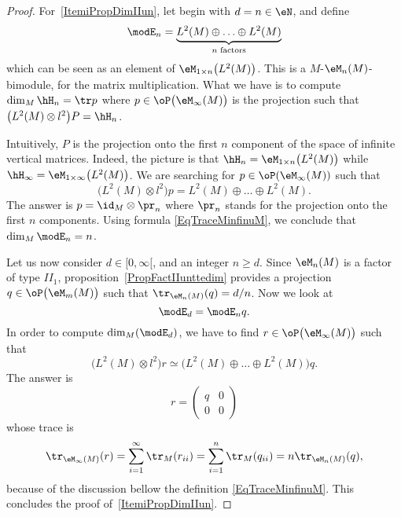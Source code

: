 \begin{proof}

	For~\ref{ItemiPropDimIIun}, let begin with $d=n\in \eN$, and define
	\begin{equation}
		\modE_n=\underbrace{  L^2(M)\oplus\ldots\oplus L^2(M)   }_{n \text{ factors}}
	\end{equation}
	which can be seen as an element of $\eM_{1\times n}\big( L^2(M) \big)$. This is a $M$-$\eM_n(M)$-bimodule, for the matrix multiplication. What we have is to compute $\dim_{M}\hH_n=\tr p$ where $p\in\oP\big( \eM_{\infty}(M) \big)$ is the projection such that $\big( L^2(M)\otimes l^2 \big)P=\hH_n$.

	Intuitively, $P$ is the projection onto the first $n$ component of the space of infinite vertical matrices. Indeed, the picture is that $\hH_n=\eM_{1\times n}\big( L^2(M) \big)$ while $\hH_{\infty}=\eM_{1\times \infty}\big( L^2(M) \big)$. We are searching for $p\in\oP(\eM_{\infty}(M))$ such that
	\begin{equation}
		\big( L^2(M)\otimes l^2 \big)p=L^2(M)\oplus\ldots\oplus L^2(M).
	\end{equation}
	The answer is $p=\id_{M}\otimes \pr_n$ where $\pr_n$ stands for the projection onto the first $n$ components. Using formula \eqref{EqTraceMinfinuM}, we conclude that $\dim_M\modE_n=n$.

	Let us now consider $d\in[0,\infty[$, and an integer $n\geq d$. Since $\eM_n(M)$ is a factor of type $II_1$, proposition~\ref{PropFactIIunttedim} provides a projection $q\in\oP\big( \eM_m(M) \big)$ such that $\tr_{\eM_n(M)}(q)=d/n$. Now we look at
	\begin{equation}
		\modE_d=\modE_nq.
	\end{equation}
	In order to compute $\dim_M(\modE_d)$, we have to find $r\in\oP\big( \eM_{\infty}(M) \big)$ such that
	\begin{equation}
		\big( L^2(M)\otimes l^2 \big)r\simeq \big( L^2(M)\oplus\ldots\oplus L^2(M) \big)q.
	\end{equation}
	The answer is
	\begin{equation}
		r=
		\begin{pmatrix}
			q & 0 \\
			0 & 0
		\end{pmatrix}
	\end{equation}
	whose trace is
	\begin{equation}
		\tr_{\eM_{\infty}(M)}(r)=\sum_{i=1}^{\infty}\tr_M(r_{ii})=\sum_{i=1}^n\tr_M(q_{ii})=n\tr_{\eM_n(M)}(q),
	\end{equation}
	because of the discussion bellow the definition \eqref{EqTraceMinfinuM}. This concludes the proof of~\ref{ItemiPropDimIIun}.


\end{proof}
